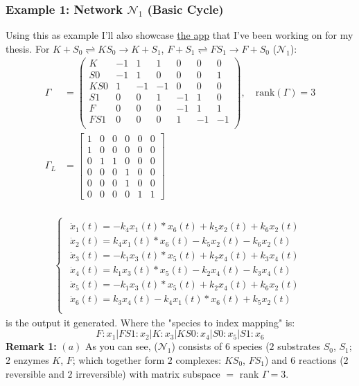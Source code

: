 \documentclass[aspectratio=169]{beamer}
\begin{document}
\begin{frame}{\insertsectionhead}
	\frametitle{Example 1: Network $\mathcal{N}_1$ (Basic Cycle)} Using this as example I'll also showcase \href{https://github.com/viktorashi/Open-CoNtRol}{the app} that I've been working on for my thesis.
	For $K + S_0 \rightleftharpoons KS_0 \rightarrow K + S_1$, $F + S_1 \rightleftharpoons FS_1 \rightarrow F + S_0$ ($\mathcal{N}_1$):
	\begin{align*}
		\Gamma &=
		\begin{pmatrix}
			K & -1 &  1 &  1 &  0 &  0 &  0 \\
			S0& -1 &  1 &  0 &  0 &  0 &  1 \\
			KS0 &  1& -1& -1 &  0 &  0 &  0 \\
			S1 &  0 &  0 &  1& -1 &  1 &  0 \\
			F &  0 &  0 &  0& -1 &  1 &  1 \\
			FS1 &  0 &  0 &  0 &  1& -1& -1  \\		
		\end{pmatrix}, \quad \text{rank}(\Gamma) = 3 \\[3ex]
		\Gamma_L &=
		\begin{bmatrix}
			1&0&0&0&0&0\\
			1&0&0&0&0&0\\
			0&1&1&0&0&0\\
			0&0&0&1&0&0\\
			0&0&0&1&0&0\\
			0&0&0&0&1&1
		\end{bmatrix} \\[3ex]
	\end{align*}
\end{frame}

\begin{frame}
	\begin{align*}
		\begin{cases*}
			\begin{array}{ll}
				\dot{x}_1(t) = -k_4 x_1(t) *x_6(t)+k_5 x_2(t)+k_6 x_2(t) \\
				\dot{x}_2(t) = k_4 x_1(t) *x_6(t)-k_5 x_2(t)-k_6 x_2(t) \\
				\dot{x}_3(t) = -k_1 x_3(t) *x_5(t)+k_2 x_4(t)+k_3 x_4(t) \\
				\dot{x}_4(t) = k_1 x_3(t) *x_5(t)-k_2 x_4(t)-k_3 x_4(t) \\
				\dot{x}_5(t) = -k_1 x_3(t) *x_5(t)+k_2 x_4(t)+k_6 x_2(t) \\
				\dot{x}_6(t) = k_3 x_4(t)-k_4 x_1(t) *x_6(t)+k_5 x_2(t) \\
			\end{array}	
		\end{cases*}		
	\end{align*}
	is the output it generated.
	Where the "species to index mapping" is:
	\[
		F:  x_1
		| FS1: x_2
		| K: x_3
		| KS0: x_4
		| S0: x_5
		| S1: x_6
	\]
	\textbf{Remark 1:} $(a)$ As you can see, ($\mathcal{N}_1$) consists of $6$ species ($2$ substrates $S_0$, $S_1$; $2$ enzymes $K$, $F$; which together form $2$ complexes: $K S_0$, $F S_1$) and $6$ reactions ($2$ reversible and $2$ irreversible) with matrix subspace $=$ rank $\Gamma = 3$.
\end{frame}
\end{document}
